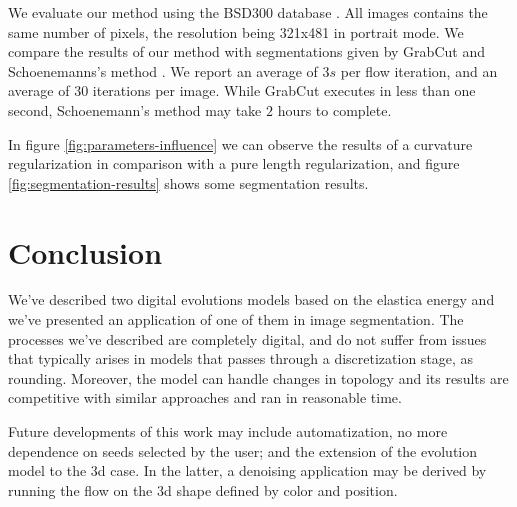 \documentclass[runningheads]{llncs}
\begin{document}
We evaluate our method using the BSD300 database \cite{martinFTM01berkeley}. All images contains the same number of pixels, the resolution being 321x481 in portrait mode. We compare the results of our method with segmentations given by GrabCut and Schoenemanns's method \cite{schoenemann09linear}. We report an average of $3s$ per flow iteration, and an average of $30$ iterations per image. While GrabCut executes in less than one second, Schoenemann's method may take $2$ hours to complete.


In figure \ref{fig:parameters-influence} we can observe the results of a curvature regularization in comparison with a pure length regularization, and figure \ref{fig:segmentation-results} shows some segmentation results.



\section{Conclusion}\label{sec:conclusion}


We've described two digital evolutions models based on the elastica energy and we've presented an application of one of them in image segmentation. The processes we've described are completely digital, and do not suffer from issues that typically arises in models that passes through a discretization stage, as rounding. Moreover, the model can handle changes in topology and its results are competitive with similar approaches and ran in reasonable time. 

Future developments of this work may include automatization, no more dependence on seeds selected by the user; and the extension of the evolution model to the $3$d case. In the latter, a denoising application may be derived by running the flow on the $3$d shape defined by color and position.



%
%
%


\end{document}
